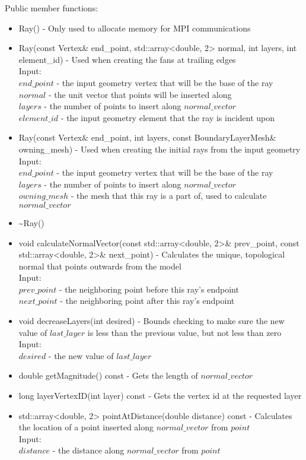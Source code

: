 \documentclass[manuscript, screen]{acmart}
\begin{document}
Public member functions:
\begin{itemize}
\item Ray() - Only used to allocate memory for MPI communications

\item Ray(const Vertex\& end\_point, std::array<double, 2> normal, int layers, int element\_id) - Used when creating the fans at trailing edges\\
Input:\\
$end\_point$ - the input geometry vertex that will be the base of the ray\\
$normal$ - the unit vector that points will be inserted along\\
$layers$ - the number of points to insert along $normal\_vector$\\
$element\_id$ - the input geometry element that the ray is incident upon

\item Ray(const Vertex\& end\_point, int layers, const BoundaryLayerMesh\& owning\_mesh) - Used when creating the initial rays from the input geometry\\
Input:\\
$end\_point$ - the input geometry vertex that will be the base of the ray\\
$layers$ - the number of points to insert along $normal\_vector$\\
$owning\_mesh$ - the mesh that this ray is a part of, used to calculate $normal\_vector$

\item \textasciitilde{}Ray()
%

\item void calculateNormalVector(const std::array<double, 2>\& prev\_point, const std::array<double, 2>\& next\_point) - Calculates the unique, topological normal that points outwards from the model\\
Input:\\
$prev\_point$ - the neighboring point before this ray's endpoint\\
$next\_point$ - the neighboring point after this ray's endpoint

\item void decreaseLayers(int desired) - Bounds checking to make sure the new value of $last\_layer$ is less than the previous value, but not less than zero
Input:\\
$desired$ - the new value of $last\_layer$

\item double getMagnitude() const - Gets the length of $normal\_vector$
    
\item long layerVertexID(int layer) const - Gets the vertex id at the requested layer

\item std::array<double, 2> pointAtDistance(double distance) const - Calculates the location of a point inserted along $normal\_vector$ from $point$\\
Input:\\
$distance$ - the distance along $normal\_vector$ from $point$

\end{itemize}
\end{document}

